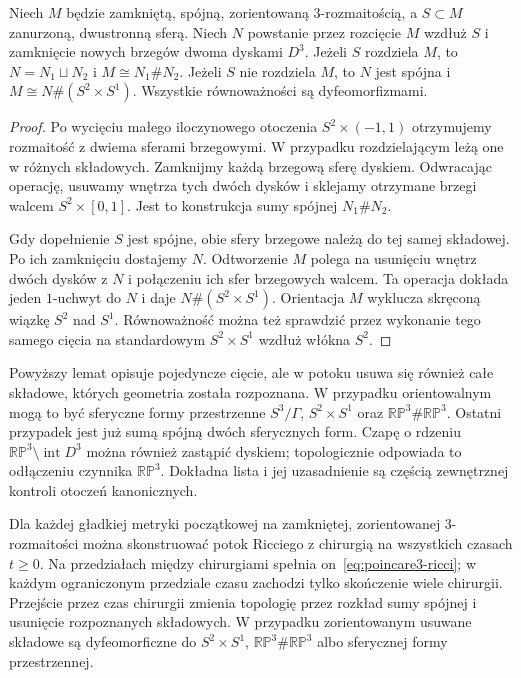 \begin{lemat}
\label{lem:poincare3-sphere-cut}
Niech $M$ będzie zamkniętą, spójną,
zorientowaną $3$-rozmaitością, a
$S\subset M$ zanurzoną, dwustronną sferą.
Niech $N$ powstanie przez rozcięcie $M$
wzdłuż $S$ i zamknięcie nowych brzegów
dwoma dyskami $D^3$.
Jeżeli $S$ rozdziela $M$, to $N=N_1\sqcup N_2$
i $M\cong N_1\#N_2$.
Jeżeli $S$ nie rozdziela $M$, to $N$ jest spójna
i $M\cong N\#(S^2\times S^1)$.
Wszystkie równoważności są dyfeomorfizmami.
\end{lemat}
\begin{proof}
Po wycięciu małego iloczynowego otoczenia
$S^2\times(-1,1)$ otrzymujemy rozmaitość
z dwiema sferami brzegowymi. W przypadku
rozdzielającym leżą one w różnych składowych.
Zamknijmy każdą brzegową sferę dyskiem.
Odwracając operację, usuwamy wnętrza tych
dwóch dysków i sklejamy otrzymane brzegi
walcem $S^2\times[0,1]$. Jest to konstrukcja
sumy spójnej $N_1\#N_2$.

Gdy dopełnienie $S$ jest spójne, obie sfery
brzegowe należą do tej samej składowej.
Po ich zamknięciu dostajemy $N$.
Odtworzenie $M$ polega na usunięciu wnętrz
dwóch dysków z $N$ i połączeniu ich sfer
brzegowych walcem. Ta operacja dokłada
jeden $1$-uchwyt do $N$ i daje
$N\#(S^2\times S^1)$. Orientacja $M$
wyklucza skręconą wiązkę $S^2$ nad $S^1$.
Równoważność można też sprawdzić przez
wykonanie tego samego cięcia na standardowym
$S^2\times S^1$ wzdłuż włókna $S^2$.
\end{proof}

\begin{uwaga}
\label{rem:poincare3-discarded}
Powyższy lemat opisuje pojedyncze cięcie,
ale w potoku usuwa się również całe składowe,
których geometria została rozpoznana. W przypadku
orientowalnym mogą to być sferyczne formy
przestrzenne $S^3/\Gamma$, $S^2\times S^1$
oraz $\mathbb{RP}^3\#\mathbb{RP}^3$.
Ostatni przypadek jest już sumą spójną
dwóch sferycznych form. Czapę o rdzeniu
$\mathbb{RP}^3\setminus\operatorname{int}D^3$
można również zastąpić dyskiem; topologicznie
odpowiada to odłączeniu czynnika
$\mathbb{RP}^3$.
Dokładna lista i jej uzasadnienie są częścią
zewnętrznej kontroli otoczeń kanonicznych.
\end{uwaga}

\begin{twierdzenie}
\label{thm:poincare3-surgery-flow}
Dla każdej gładkiej metryki początkowej
na zamkniętej, zorientowanej $3$-rozmaitości
można skonstruować potok Ricciego z chirurgią
na wszystkich czasach $t\geq0$.
Na przedziałach między chirurgiami spełnia
on~\eqref{eq:poincare3-ricci}; w każdym
ograniczonym przedziale czasu zachodzi tylko
skończenie wiele chirurgii. Przejście przez
czas chirurgii zmienia topologię przez
rozkład sumy spójnej i usunięcie rozpoznanych
składowych. W przypadku zorientowanym
usuwane składowe są dyfeomorficzne do
$S^2\times S^1$, $\mathbb{RP}^3\#\mathbb{RP}^3$
albo sferycznej formy przestrzennej.
\end{twierdzenie}

